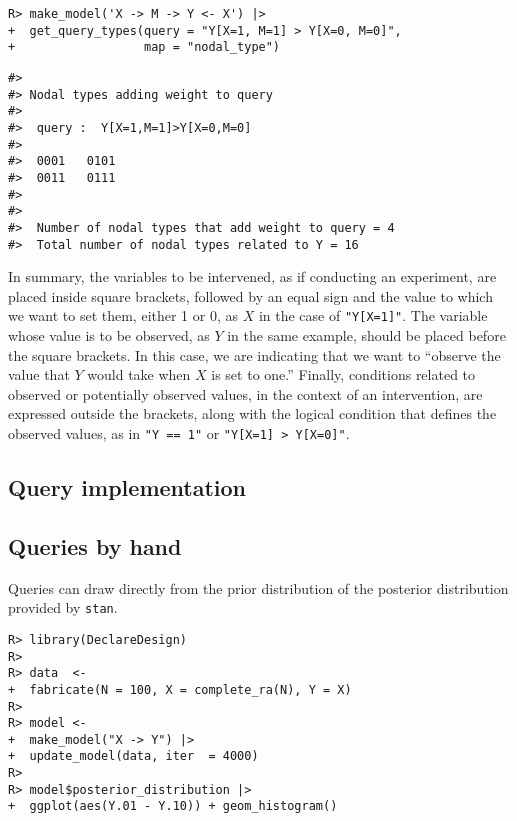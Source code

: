 \documentclass[
  11pt,
  article]{jss}
\begin{document}
\begin{verbatim}
R> make_model('X -> M -> Y <- X') |> 
+  get_query_types(query = "Y[X=1, M=1] > Y[X=0, M=0]", 
+                  map = "nodal_type")
\end{verbatim}

\begin{verbatim}
#> 
#> Nodal types adding weight to query
#> 
#>  query :  Y[X=1,M=1]>Y[X=0,M=0] 
#> 
#>  0001   0101
#>  0011   0111
#> 
#> 
#>  Number of nodal types that add weight to query = 4
#>  Total number of nodal types related to Y = 16
\end{verbatim}

In summary, the variables to be intervened, as if conducting an
experiment, are placed inside square brackets, followed by an equal sign
and the value to which we want to set them, either 1 or 0, as \(X\) in
the case of \texttt{"Y{[}X=1{]}"}. The variable whose value is to be
observed, as \(Y\) in the same example, should be placed before the
square brackets. In this case, we are indicating that we want to
``observe the value that \(Y\) would take when \(X\) is set to one.''
Finally, conditions related to observed or potentially observed values,
in the context of an intervention, are expressed outside the brackets,
along with the logical condition that defines the observed values, as in
\texttt{"Y\ ==\ 1"} or
\texttt{"Y{[}X=1{]}\ \textgreater{}\ Y{[}X=0{]}"}.

\hypertarget{query-implementation}{%
\subsection{Query implementation}\label{query-implementation}}

\hypertarget{queries-by-hand}{%
\subsection{Queries by hand}\label{queries-by-hand}}

Queries can draw directly from the prior distribution of the posterior
distribution provided by \texttt{stan}.

\begin{verbatim}
R> library(DeclareDesign)
R> 
R> data  <- 
+  fabricate(N = 100, X = complete_ra(N), Y = X)
R> 
R> model <- 
+  make_model("X -> Y") |>
+  update_model(data, iter  = 4000)
R> 
R> model$posterior_distribution |> 
+  ggplot(aes(Y.01 - Y.10)) + geom_histogram()
\end{verbatim}
\end{document}
